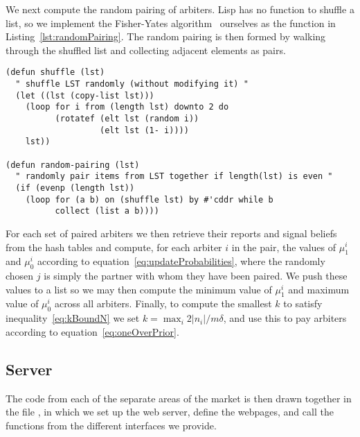 We next compute the random pairing of arbiters. Lisp has no function to shuffle
a list, so we implement the Fisher-Yates
algorithm~\cite[pg.~26-27]{FisherYates1938} ourselves as the 
function in Listing~\ref{lst:randomPairing}. The random pairing is then formed
by walking through the shuffled list and collecting adjacent elements as pairs.

\begin{lstlisting}[float,
	label={lst:randomPairing},
	caption={Assigning arbiters to peers randomly}]
(defun shuffle (lst)
  " shuffle LST randomly (without modifying it) "
  (let ((lst (copy-list lst)))
    (loop for i from (length lst) downto 2 do
          (rotatef (elt lst (random i))
                   (elt lst (1- i))))
    lst))

(defun random-pairing (lst)
  " randomly pair items from LST together if length(lst) is even "
  (if (evenp (length lst))
    (loop for (a b) on (shuffle lst) by #'cddr while b
          collect (list a b))))
\end{lstlisting}

For each set of paired arbiters we then retrieve their reports and signal
beliefs from the hash tables and compute, for each arbiter $i$ in the pair, the
values of $\mu_1^i$ and $\mu_0^i$ according to
equation~\eqref{eq:updateProbabilities}, where the randomly chosen $j$ is
simply the partner with whom they have been paired. We push these values to a
list so we may then compute the minimum value of $\mu_1^i$ and maximum value of
$\mu_0^i$ across all arbiters. Finally, to compute the smallest $k$ to satisfy
inequality~\eqref{eq:kBoundN} we set $k = \max_i 2|n_i|/m\delta$, and use this
to pay arbiters according to equation~\eqref{eq:oneOverPrior}.

\subsection{Server}

\label{sec:server}

The code from each of the separate areas of the market is then drawn together
in the file , in which we set up the web server, define the
webpages, and call the functions from the different interfaces we provide.

